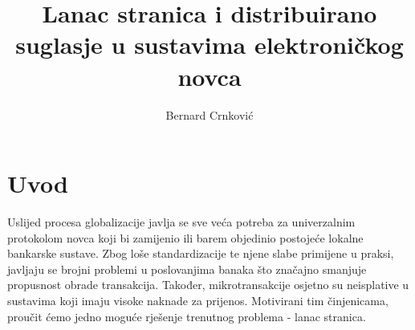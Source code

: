 \documentclass[utf8, zavrsni]{fer}
\begin{document}

\title{Lanac stranica i distribuirano suglasje u sustavima elektroničkog novca}

\author{Bernard Crnković}

\maketitle

\izvornik

\zahvala{}

\tableofcontents

\chapter{Uvod}
Uslijed procesa globalizacije javlja se sve veća potreba za univerzalnim protokolom novca koji bi zamijenio ili barem objedinio postojeće lokalne bankarske sustave. Zbog loše standardizacije te njene slabe primijene u praksi, javljaju se brojni problemi u poslovanjima banaka što značajno smanjuje propusnost obrade transakcija. Također, mikrotransakcije osjetno su neisplative u sustavima koji imaju visoke naknade za prijenos. Motivirani tim činjenicama, proučit ćemo jedno moguće rješenje trenutnog problema - lanac stranica.
\end{document}
